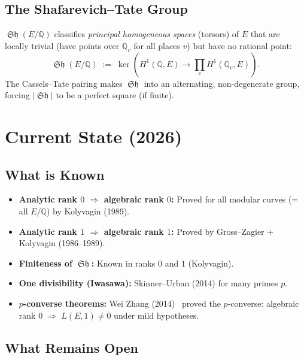 \documentclass[12pt,a4paper]{article}
\theoremstyle{remark}
\DeclareMathOperator{\Sha}{\mathfrak{Sh}}
\begin{document}
\subsection{The Shafarevich--Tate Group}

$\Sha(E/\mathbb{Q})$ classifies \emph{principal homogeneous spaces} (torsors) of $E$
that are locally trivial (have points over $\mathbb{Q}_v$ for all places $v$) but have
no rational point:
\[
  \Sha(E/\mathbb{Q}) \;:=\; \ker\!\left(H^1(\mathbb{Q}, E) \to \prod_v H^1(\mathbb{Q}_v, E)\right).
\]
The Cassels--Tate pairing makes $\Sha$ into an alternating, non-degenerate group, forcing
$|\Sha|$ to be a perfect square (if finite).

\section{Current State (2026)}

\subsection{What is Known}

\begin{itemize}[nosep]
  \item \textbf{Analytic rank $0$ $\Rightarrow$ algebraic rank $0$:} Proved for all
    modular curves (= all $E/\mathbb{Q}$) by Kolyvagin (1989).
  \item \textbf{Analytic rank $1$ $\Rightarrow$ algebraic rank $1$:} Proved by
    Gross--Zagier + Kolyvagin (1986--1989).
  \item \textbf{Finiteness of $\Sha$:} Known in ranks $0$ and $1$ (Kolyvagin).
  \item \textbf{One divisibility (Iwasawa):} Skinner--Urban (2014) for many primes $p$.
  \item \textbf{$p$-converse theorems:} Wei Zhang (2014)~\cite{WeiZhang2014} proved the
    $p$-converse: algebraic rank $0$ $\Rightarrow$ $L(E,1) \neq 0$ under mild hypotheses.
\end{itemize}

\subsection{What Remains Open}
\end{document}
